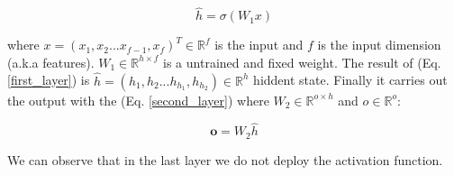 \begin{equation}
    \label{first_layer}
    \hat{h} = \sigma(W_1x)
\end{equation}

where $x = (x_1, x_2 ... x_{f-1},x_f)^T \in \mathbb{R}^f$ is the input and $f$ is the input dimension (a.k.a features). $W_1 \in \mathbb{R}^{h \times f}$ is a untrained and fixed weight. The result of (Eq. \ref{first_layer}) is $\hat{h} = (h_1,h_2...h_{h_1},h_{h_2}) \in \mathbb{R}^h$ hiddent state. Finally it carries out the output with the (Eq. \ref{second_layer}) where $W_2\in \mathbb{R}^{o \times h}$ and $o \in \mathbb{R}^{o}$:

\begin{equation}
    \label{second_layer}
    \mathbf{o} = W_2\hat{h}
\end{equation}

We can observe that in the last layer we do not deploy the activation function.
